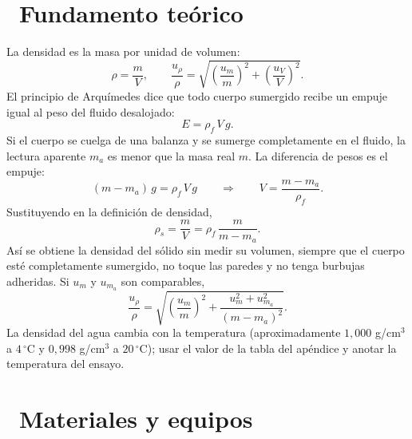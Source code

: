 \documentclass[11pt,a4paper]{article}
\newcommand{\iconotexto}[2]{\textcolor{cyanNeon}{\faIcon{#1}}~#2}
\begin{document}
\section{\iconotexto{book-open}{Fundamento teórico}}

La densidad es la masa por unidad de volumen:
\[
  \rho = \frac{m}{V}, \qquad
  \frac{u_\rho}{\rho} = \sqrt{\left(\frac{u_m}{m}\right)^2
                            + \left(\frac{u_V}{V}\right)^2}.
\]
El principio de Arquímedes dice que todo cuerpo sumergido recibe un
empuje igual al peso del fluido desalojado:
\[
  E = \rho_f\,V\,g.
\]
Si el cuerpo se cuelga de una balanza y se sumerge completamente en el
fluido, la lectura aparente $m_a$ es menor que la masa real $m$. La
diferencia de pesos es el empuje:
\[
  (m - m_a)\,g = \rho_f\,V\,g
  \qquad\Longrightarrow\qquad
  V = \frac{m - m_a}{\rho_f}.
\]
Sustituyendo en la definición de densidad,
\[
  \rho_s = \frac{m}{V} = \rho_f\,\frac{m}{m - m_a}.
\]
Así se obtiene la densidad del sólido sin medir su volumen, siempre que
el cuerpo esté completamente sumergido, no toque las paredes y no tenga
burbujas adheridas. Si $u_m$ y $u_{m_a}$ son comparables,
\[
  \frac{u_\rho}{\rho}
  = \sqrt{\left(\frac{u_m}{m}\right)^2
          + \frac{u_m^2 + u_{m_a}^2}{(m-m_a)^2}}.
\]
La densidad del agua cambia con la temperatura (aproximadamente
$1{,}000$ g/cm$^3$ a $4\,^\circ$C y $0{,}998$ g/cm$^3$ a $20\,^\circ$C);
usar el valor de la tabla del apéndice y anotar la temperatura del
ensayo.

\begin{center}
\par{}
\end{center}

\section{\iconotexto{box-open}{Materiales y equipos}}
\end{document}

